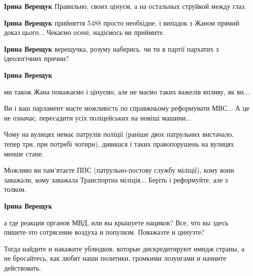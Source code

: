 \begin{itemize}
\begin{itemize}
\textbf{Ірина Верещук} Правильно, своих цінуєм, а на остальных струйкой между глаз.

 
\textbf{Ірина Верещук} прийняття 5488 просто необхідне, і випадок з Жаном прямий доказ цього...
Чекаємо осені, надіємось ви приймите.

 
\textbf{Ірина Верещук} верещучка, розуму наберись. чи ти в партії пархатих з ідеологічних причин?

 
\textbf{Ірина Верещук} 

ми також Жана поважаємо і цінуємо, але не маємо таких важелів впливу, як ви...

Ви і ваш парламент маєте можливість по справжньому реформувати МВС... А це не
означає, пересадити усіх поліцейських на новіші машини...

Чому на вулицях немає патрулів поліції (раніше двох патрульних вистачало, тепер
три, при потребі чотири), дивишся і таких правопорушень на вулицях менше стане.

Можливо ви пам'ятаєте ППС (патрульно-постову службу міліції), кому вони
заважали, кому заважала Транспортна міліція... Беріть і реформуйте, але з
толком.


\textbf{Ірина Верещук} 

а где реакция органов МВД, или вы крышуете нациков? Все,
что вы здесь пишете-это сотрясение воздуха и популизм. Поважаэте и цинуэте?

Тогда найдите и накажите ублюдков, которые дискредитируют имидж страны, а не
бросайтесь, как любят наши политики, громкими лозунгами и начните действовать.


\end{itemize}
\end{itemize}
